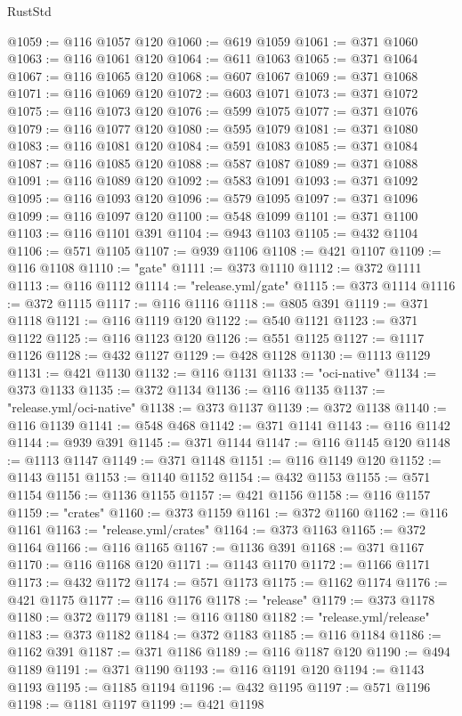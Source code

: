 \begin{lexlean}{RustStd}
\begin{coremodule}
@1059 := @116 @1057 @120
@1060 := @619 @1059
@1061 := @371 @1060
@1063 := @116 @1061 @120
@1064 := @611 @1063
@1065 := @371 @1064
@1067 := @116 @1065 @120
@1068 := @607 @1067
@1069 := @371 @1068
@1071 := @116 @1069 @120
@1072 := @603 @1071
@1073 := @371 @1072
@1075 := @116 @1073 @120
@1076 := @599 @1075
@1077 := @371 @1076
@1079 := @116 @1077 @120
@1080 := @595 @1079
@1081 := @371 @1080
@1083 := @116 @1081 @120
@1084 := @591 @1083
@1085 := @371 @1084
@1087 := @116 @1085 @120
@1088 := @587 @1087
@1089 := @371 @1088
@1091 := @116 @1089 @120
@1092 := @583 @1091
@1093 := @371 @1092
@1095 := @116 @1093 @120
@1096 := @579 @1095
@1097 := @371 @1096
@1099 := @116 @1097 @120
@1100 := @548 @1099
@1101 := @371 @1100
@1103 := @116 @1101 @391
@1104 := @943 @1103
@1105 := @432 @1104
@1106 := @571 @1105
@1107 := @939 @1106
@1108 := @421 @1107
@1109 := @116 @1108
@1110 := "gate"
@1111 := @373 @1110
@1112 := @372 @1111
@1113 := @116 @1112
@1114 := "release.yml/gate"
@1115 := @373 @1114
@1116 := @372 @1115
@1117 := @116 @1116
@1118 := @805 @391
@1119 := @371 @1118
@1121 := @116 @1119 @120
@1122 := @540 @1121
@1123 := @371 @1122
@1125 := @116 @1123 @120
@1126 := @551 @1125
@1127 := @1117 @1126
@1128 := @432 @1127
@1129 := @428 @1128
@1130 := @1113 @1129
@1131 := @421 @1130
@1132 := @116 @1131
@1133 := "oci-native"
@1134 := @373 @1133
@1135 := @372 @1134
@1136 := @116 @1135
@1137 := "release.yml/oci-native"
@1138 := @373 @1137
@1139 := @372 @1138
@1140 := @116 @1139
@1141 := @548 @468
@1142 := @371 @1141
@1143 := @116 @1142
@1144 := @939 @391
@1145 := @371 @1144
@1147 := @116 @1145 @120
@1148 := @1113 @1147
@1149 := @371 @1148
@1151 := @116 @1149 @120
@1152 := @1143 @1151
@1153 := @1140 @1152
@1154 := @432 @1153
@1155 := @571 @1154
@1156 := @1136 @1155
@1157 := @421 @1156
@1158 := @116 @1157
@1159 := "crates"
@1160 := @373 @1159
@1161 := @372 @1160
@1162 := @116 @1161
@1163 := "release.yml/crates"
@1164 := @373 @1163
@1165 := @372 @1164
@1166 := @116 @1165
@1167 := @1136 @391
@1168 := @371 @1167
@1170 := @116 @1168 @120
@1171 := @1143 @1170
@1172 := @1166 @1171
@1173 := @432 @1172
@1174 := @571 @1173
@1175 := @1162 @1174
@1176 := @421 @1175
@1177 := @116 @1176
@1178 := "release"
@1179 := @373 @1178
@1180 := @372 @1179
@1181 := @116 @1180
@1182 := "release.yml/release"
@1183 := @373 @1182
@1184 := @372 @1183
@1185 := @116 @1184
@1186 := @1162 @391
@1187 := @371 @1186
@1189 := @116 @1187 @120
@1190 := @494 @1189
@1191 := @371 @1190
@1193 := @116 @1191 @120
@1194 := @1143 @1193
@1195 := @1185 @1194
@1196 := @432 @1195
@1197 := @571 @1196
@1198 := @1181 @1197
@1199 := @421 @1198

\end{coremodule}
\end{lexlean}
